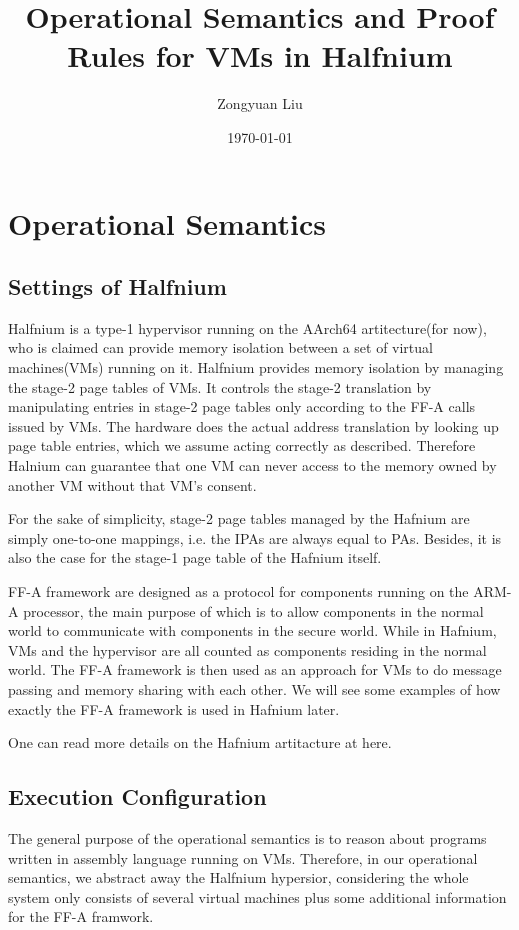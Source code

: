 \documentclass[a4paper]{article}
\title{Operational Semantics and Proof Rules for VMs in Halfnium}
\date{\today}
\author{Zongyuan Liu}
\begin{document}
\maketitle

\section{Operational Semantics}

\subsection{Settings of Halfnium}
Halfnium is a type-1 hypervisor running on the AArch64 artitecture(for now), who is claimed can provide memory isolation between a set of virtual machines(VMs) running on it.
Halfnium provides memory isolation by managing the stage-2 page tables of VMs. It controls the stage-2 translation by manipulating entries in stage-2 page tables only according to the FF-A calls issued by VMs. The hardware does the actual address translation by looking up page table entries, which we assume acting correctly as described. Therefore Halnium can guarantee that one VM can never access to the memory owned by another VM without that VM's consent.

For the sake of simplicity, stage-2 page tables managed by the Hafnium are simply one-to-one mappings, i.e. the IPAs are always equal to PAs. Besides, it is also the case for the stage-1 page table of the Hafnium itself.

FF-A framework are designed as a protocol for components running on the ARM-A processor, the main purpose of which is to allow components in the normal world to communicate with components in the secure world. While in Hafnium, VMs and the hypervisor are all counted as components residing in the normal world. The FF-A framework is then used as an approach for VMs to do message passing and memory sharing with each other. We will see some examples of how exactly the FF-A framework is used in Hafnium later.

One can read more details on the Hafnium artitacture at here.

\subsection{Execution Configuration}
The general purpose of the operational semantics is to reason about programs written in assembly language running on VMs. Therefore, in our operational semantics, we abstract away the Halfnium hypersior, considering the whole system only consists of several virtual machines plus some additional information for the FF-A framwork.
\end{document}
